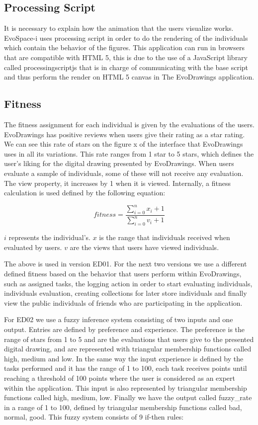 \subsection{Processing Script}
It is necessary to explain how the animation
that the users visualize works. EvoSpace-i uses processing script in order to do
the rendering of the individuals which contain the behavior of the figures. This
application can run in browsers that are compatible with HTML 5, this is due to
the use of a JavaScript library called processingscriptjs that is in charge of
communicating with the base script and thus perform the render on HTML 5 canvas
in The EvoDrawings application.

\subsection{Fitness}
The fitness assignment for each individual is given by the
evaluations of the users. EvoDrawings has positive reviews when users give their
rating as a star rating. We can see this rate of stars on the figure x of the
interface that EvoDrawings uses in all its variations. This rate ranges from 1
star to 5 stars, which defines the user's liking for the digital drawing
presented by EvoDrawings. When users evaluate a sample of individuals, some of
these will not receive any evaluation. The view property, it increases by 1 when
it is viewed. Internally, a fitness calculation is used defined by the following
equation:

\begin{equation}\label{eq:fitfunc01}
\displaystyle fitness=\frac{\sum_{i=0}^{n}x_{i}+ 1}{\sum_{i=0}^{n}v_{i} + 1}
\end{equation}

$i$ represents the individual's.
$x$ is the range that individuals received when evaluated by users.
$v$ are the views that users have viewed individuals.

The above is used in version ED01. For the next two versions we use a different
defined fitness based on the behavior that users perform within EvoDrawings,
such as assigned tasks, the logging action in order to start evaluating
individuals, individuals evaluation, creating collections for later store
individuals and finally view the public individuals of friends who are
participating in the application.

For ED02 we use a fuzzy inference system consisting of two inputs and one
output. Entries are defined by preference and experience. The preference is the
range of stars from 1 to 5 and are the evaluations that users give to the
presented digital drawing, and are represented with triangular membership
functions called high, medium and low. In the same way the input experience is
defined by the tasks performed and it has the range of 1 to 100, each task
receives points until reaching a threshold of 100 points where the user is
considered as an expert within the application. This input is also represented
by triangular membership functions called high, medium, low. Finally we have the
output called fuzzy\_rate in a range of 1 to 100, defined by triangular
membership functions called bad, normal, good. This fuzzy system consists of 9
if-then rules:

